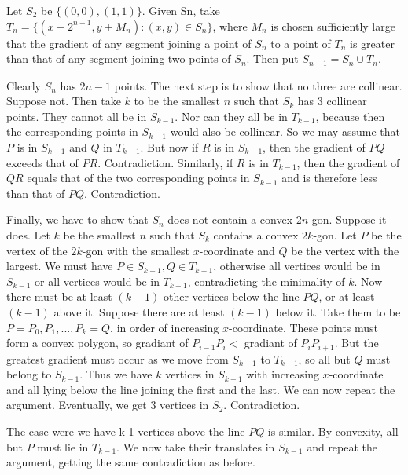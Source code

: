 \documentclass{subfile}
\begin{document}
		\begin{solution}
            Let $S_2$ be $\{(0,0), (1,1)\}$. Given Sn, take $T_n = \{(x+2^{n-1},y+M_{n}):(x,y)\in S_{n}\}$, where $M_n$ is chosen sufficiently large that the gradient of any segment joining a point of $S_n$ to a point of $T_n$ is greater than that of any segment joining two points of $S_n$. Then put $S_{n+1} = S_n\cup T_n$.

            Clearly $S_{n}$ has $2n-1$ points. The next step is to show that no three are collinear. Suppose not. Then take $k$ to be the smallest $n$ such that $S_k$ has $3$ collinear points. They cannot all be in $S_{k-1}$. Nor can they all be in $T_{k-1}$, because then the corresponding points in $S_{k-1}$ would also be collinear. So we may assume that $P$ is in $S_{k-1}$ and $Q$ in $T_{k-1}$. But now if $R$ is in $S_{k-1}$, then the gradient of $PQ$ exceeds that of $PR$. Contradiction. Similarly, if $R$ is in $T_{k-1}$, then the gradient of $QR$ equals that of the two corresponding points in $S_{k-1}$ and is therefore less than that of $PQ$. Contradiction.
            
            Finally, we have to show that $S_{n}$ does not contain a convex $2n$-gon. Suppose it does. Let $k$ be the smallest $n$ such that $S_{k}$ contains a convex $2k$-gon. Let $P$ be the vertex of the $2k$-gon with the smallest $x$-coordinate and $Q$ be the vertex with the largest. We must have $P\in S_{k-1}, Q\in T_{k-1}$, otherwise all vertices would be in $S_{k-1}$ or all vertices would be in $T_{k-1}$, contradicting the minimality of $k$. Now there must be at least $(k-1)$ other vertices below the line $PQ$, or at least $(k-1)$ above it. Suppose there are at least $(k-1)$ below it. Take them to be $P=P_0, P_1, ... , P_k=Q$, in order of increasing $x$-coordinate. These points must form a convex polygon, so gradiant of $P_{i-1}P_{i} <$ gradiant of $P_{i}P_{i+1}$. But the greatest gradient must occur as we move from $S_{k-1}$ to $T_{k-1}$, so all but $Q$ must belong to $S_{k-1}$. Thus we have $k$ vertices in $S_{k-1}$ with increasing $x$-coordinate and all lying below the line joining the first and the last. We can now repeat the argument. Eventually, we get $3$ vertices in $S_{2}$. Contradiction.
            
            The case were we have k-1 vertices above the line $PQ$ is similar. By convexity, all but $P$ must lie in $T_{k-1}$. We now take their translates in $S_{k-1}$ and repeat the argument, getting the same contradiction as before.
		\end{solution}
		
\end{document}

